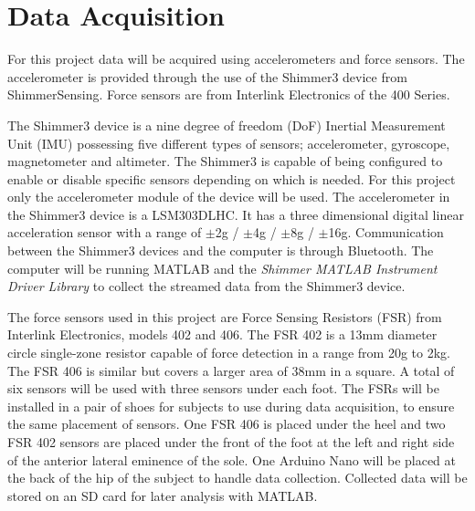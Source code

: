 \section{Data Acquisition}

For this project data will be acquired using accelerometers and force sensors. The accelerometer is provided through the use of the Shimmer3 device from ShimmerSensing. Force sensors are from Interlink Electronics of the 400 Series. %

The Shimmer3 device is a nine degree of freedom (DoF) Inertial Measurement Unit (IMU) possessing five different types of sensors; accelerometer, gyroscope, magnetometer and altimeter. The Shimmer3 is capable of being configured to enable or disable specific sensors depending on which is needed. For this project only the accelerometer module of the device will be used. The accelerometer in the Shimmer3 device is a LSM303DLHC. It has a three dimensional digital linear acceleration sensor with a range of $\pm$2g / $\pm$4g / $\pm$8g / $\pm$16g. \cite{LSM303DLHC} %
Communication between the Shimmer3 devices and the computer is through Bluetooth. The computer will be running MATLAB and the \textit{Shimmer MATLAB Instrument Driver Library} to collect the streamed data from the Shimmer3 device. 

The force sensors used in this project are Force Sensing Resistors (FSR) from Interlink Electronics, models 402 and 406. The FSR 402 is a 13mm diameter circle single-zone resistor capable of force detection in a range from 20g to 2kg. The FSR 406 is similar but covers a larger area of 38mm in a square. \cite{IE400}
A total of six sensors will be used with three sensors under each foot. The FSRs will be installed in a pair of shoes for subjects to use during data acquisition, to ensure the same placement of sensors. One FSR 406 is placed under the heel and two FSR 402 sensors are placed under the front of the foot at the left and right side of the anterior lateral eminence of the sole. One Arduino Nano will be placed at the back of the hip of the subject to handle data collection. Collected data will be stored on an SD card for later analysis with MATLAB. 


